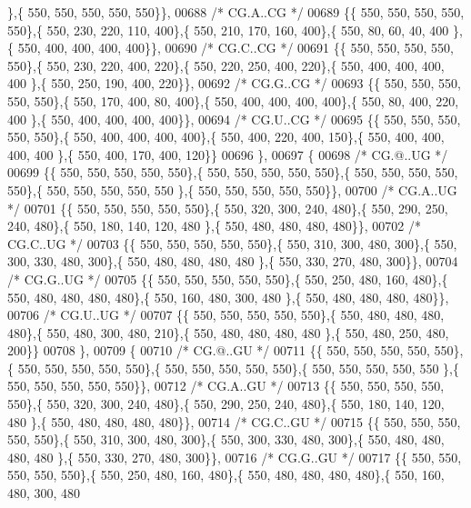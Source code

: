 \begin{DoxyCode}
      \},\{ 550, 550, 550, 550, 550\}\},
00688 \textcolor{comment}{/* CG.A..CG */}
00689 \{\{ 550, 550, 550, 550, 550\},\{ 550, 230, 220, 110, 400\},\{ 550, 210, 170, 160, 400\},\{ 550,  80,  60,  40, 400
      \},\{ 550, 400, 400, 400, 400\}\},
00690 \textcolor{comment}{/* CG.C..CG */}
00691 \{\{ 550, 550, 550, 550, 550\},\{ 550, 230, 220, 400, 220\},\{ 550, 220, 250, 400, 220\},\{ 550, 400, 400, 400, 400
      \},\{ 550, 250, 190, 400, 220\}\},
00692 \textcolor{comment}{/* CG.G..CG */}
00693 \{\{ 550, 550, 550, 550, 550\},\{ 550, 170, 400,  80, 400\},\{ 550, 400, 400, 400, 400\},\{ 550,  80, 400, 220, 400
      \},\{ 550, 400, 400, 400, 400\}\},
00694 \textcolor{comment}{/* CG.U..CG */}
00695 \{\{ 550, 550, 550, 550, 550\},\{ 550, 400, 400, 400, 400\},\{ 550, 400, 220, 400, 150\},\{ 550, 400, 400, 400, 400
      \},\{ 550, 400, 170, 400, 120\}\}
00696 \},
00697 \{
00698 \textcolor{comment}{/* CG.@..UG */}
00699 \{\{ 550, 550, 550, 550, 550\},\{ 550, 550, 550, 550, 550\},\{ 550, 550, 550, 550, 550\},\{ 550, 550, 550, 550, 550
      \},\{ 550, 550, 550, 550, 550\}\},
00700 \textcolor{comment}{/* CG.A..UG */}
00701 \{\{ 550, 550, 550, 550, 550\},\{ 550, 320, 300, 240, 480\},\{ 550, 290, 250, 240, 480\},\{ 550, 180, 140, 120, 480
      \},\{ 550, 480, 480, 480, 480\}\},
00702 \textcolor{comment}{/* CG.C..UG */}
00703 \{\{ 550, 550, 550, 550, 550\},\{ 550, 310, 300, 480, 300\},\{ 550, 300, 330, 480, 300\},\{ 550, 480, 480, 480, 480
      \},\{ 550, 330, 270, 480, 300\}\},
00704 \textcolor{comment}{/* CG.G..UG */}
00705 \{\{ 550, 550, 550, 550, 550\},\{ 550, 250, 480, 160, 480\},\{ 550, 480, 480, 480, 480\},\{ 550, 160, 480, 300, 480
      \},\{ 550, 480, 480, 480, 480\}\},
00706 \textcolor{comment}{/* CG.U..UG */}
00707 \{\{ 550, 550, 550, 550, 550\},\{ 550, 480, 480, 480, 480\},\{ 550, 480, 300, 480, 210\},\{ 550, 480, 480, 480, 480
      \},\{ 550, 480, 250, 480, 200\}\}
00708 \},
00709 \{
00710 \textcolor{comment}{/* CG.@..GU */}
00711 \{\{ 550, 550, 550, 550, 550\},\{ 550, 550, 550, 550, 550\},\{ 550, 550, 550, 550, 550\},\{ 550, 550, 550, 550, 550
      \},\{ 550, 550, 550, 550, 550\}\},
00712 \textcolor{comment}{/* CG.A..GU */}
00713 \{\{ 550, 550, 550, 550, 550\},\{ 550, 320, 300, 240, 480\},\{ 550, 290, 250, 240, 480\},\{ 550, 180, 140, 120, 480
      \},\{ 550, 480, 480, 480, 480\}\},
00714 \textcolor{comment}{/* CG.C..GU */}
00715 \{\{ 550, 550, 550, 550, 550\},\{ 550, 310, 300, 480, 300\},\{ 550, 300, 330, 480, 300\},\{ 550, 480, 480, 480, 480
      \},\{ 550, 330, 270, 480, 300\}\},
00716 \textcolor{comment}{/* CG.G..GU */}
00717 \{\{ 550, 550, 550, 550, 550\},\{ 550, 250, 480, 160, 480\},\{ 550, 480, 480, 480, 480\},\{ 550, 160, 480, 300, 480

\end{DoxyCode}
